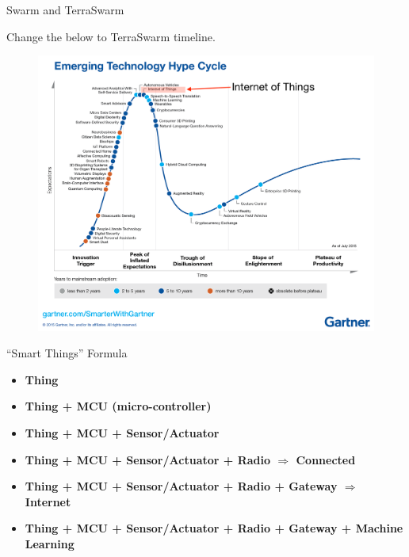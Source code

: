\begin{frame}{Swarm and TerraSwarm}

  Change the below to TerraSwarm timeline.

\end{frame}

\begin{frame}
  \begin{figure}
    \includegraphics[width=\textwidth]{figures/hype.png}
  \end{figure}
\end{frame}

\begin{frame}{``Smart Things'' Formula}

  \begin{itemize}
  \item<1-> \textbf<1>{Thing}
  \item<2-> \textbf<2>{Thing + MCU (micro-controller)}
  \item<3-> \textbf<3>{Thing + MCU + Sensor/Actuator}
  \item<4-> \textbf<4>{Thing + MCU + Sensor/Actuator + Radio $\Rightarrow$ Connected}
  \item<5-> \textbf<5>{Thing + MCU + Sensor/Actuator + Radio + Gateway $\Rightarrow$ Internet}
  \item<5-> \textbf<6>{Thing + MCU + Sensor/Actuator + Radio + Gateway + Machine Learning}
  \end{itemize}

\end{frame}

